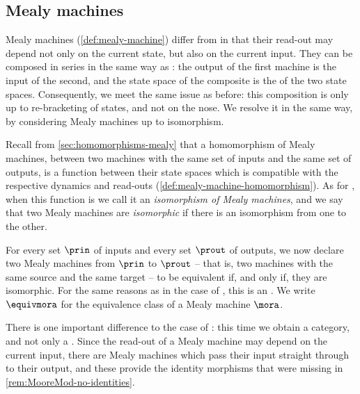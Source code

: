 \subsection{Mealy machines}

Mealy machines (\cref{def:mealy-machine}) differ from  in that their read-out may depend not only on the current state, but also on the current input.
They can be composed in series in the same way as : the output of the first machine is the input of the second, and the state space of the composite is the  of the two state spaces.
Consequently, we meet the same issue as before: this composition is  only up to re-bracketing of states, and not on the nose.
We resolve it in the same way, by considering Mealy machines up to isomorphism.

Recall from \cref{sec:homomorphisms-mealy} that a homomorphism of Mealy machines, between two machines with the same set of inputs and the same set of outputs, is a function between their state spaces which is compatible with the respective dynamics and read-outs (\cref{def:mealy-machine-homomorphism}).
As for , when this function is  we call it an \emph{isomorphism of Mealy machines}, and we say that two Mealy machines are \emph{isomorphic} if there is an isomorphism from one to the other.

For every set $\prin$ of inputs and every set $\prout$ of outputs, we now declare two Mealy machines from $\prin$ to $\prout$ -- that is, two machines with the same source and the same target -- to be equivalent if, and only if, they are isomorphic.
For the same reasons as in the case of , this is an .
We write $\equivmora$ for the equivalence class of a Mealy machine $\mora$.

There is one important difference to the case of : this time we obtain a category, and not only a .
Since the read-out of a Mealy machine may depend on the current input, there are Mealy machines which pass their input straight through to their output, and these provide the identity morphisms that were missing in \cref{rem:MooreMod-no-identities}.


